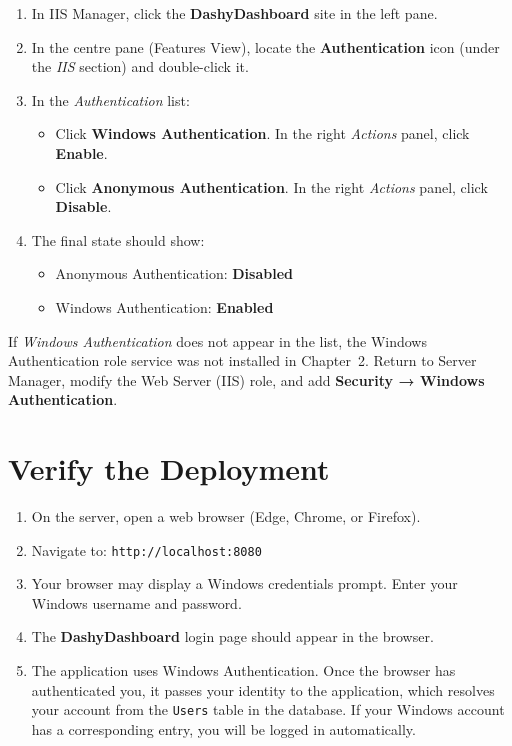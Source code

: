 \documentclass[12pt,a4paper]{report}
\begin{document}
\begin{enumerate}
  \item In IIS Manager, click the \textbf{DashyDashboard} site in the left pane.

  \item In the centre pane (Features View), locate the \textbf{Authentication} icon (under the \emph{IIS} section) and double-click it.

  \item In the \emph{Authentication} list:
  \begin{itemize}
    \item Click \textbf{Windows Authentication}. In the right \emph{Actions} panel, click \textbf{Enable}.
    \item Click \textbf{Anonymous Authentication}. In the right \emph{Actions} panel, click \textbf{Disable}.
  \end{itemize}

  \item The final state should show:
  \begin{itemize}
    \item Anonymous Authentication: \textbf{Disabled}
    \item Windows Authentication: \textbf{Enabled}
  \end{itemize}
\end{enumerate}

\begin{warnbox}
If \emph{Windows Authentication} does not appear in the list, the Windows Authentication role service was not installed in Chapter~2. Return to Server Manager, modify the Web Server (IIS) role, and add \textbf{Security → Windows Authentication}.
\end{warnbox}

\chapter{Verify the Deployment}

\begin{enumerate}
  \item On the server, open a web browser (Edge, Chrome, or Firefox).

  \item Navigate to: \texttt{http://localhost:8080}

  \item Your browser may display a Windows credentials prompt. Enter your Windows username and password.

  \item The \textbf{DashyDashboard} login page should appear in the browser.

  \item The application uses Windows Authentication. Once the browser has authenticated you, it passes your identity to the application, which resolves your account from the \texttt{Users} table in the database. If your Windows account has a corresponding entry, you will be logged in automatically.
\end{enumerate}
\end{document}
